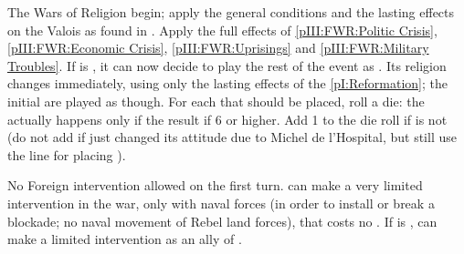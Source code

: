 

\phevnt
\aparag The Wars of Religion begin; apply the general conditions and the
lasting effects on the Valois as found in .
\aparag Apply the full effects of \ref{pIII:FWR:Politic Crisis},
\ref{pIII:FWR:Economic Crisis}, \ref{pIII:FWR:Uprisings} and
\ref{pIII:FWR:Military Troubles}.
\label{pIII:FWR:Hospital} If \FRA is \CATHCR, it
can now decide to play the rest of the event as \CATHCO.  Its religion changes
immediately, using only the lasting effects of the \ref{pI:Reformation}; the
initial \REVOLT are played as \CATHCR though.
\aparag For each \REVOLT that should be placed, roll a die: the \REVOLT
actually happens only if the result if 6 or higher. Add 1 to the die roll if
\FRA is not \CATHCO (do not add if \FRA just changed its attitude due to
Michel de l'Hospital, but still use the \CATHCR line for placing \REVOLT ).

\phdipl
\aparag No Foreign intervention allowed on the first turn.
\aparag \REB can make a very limited intervention in the war, only with naval
forces (in order to install or break a blockade; no naval movement of Rebel
land forces), that costs no \STAB.
\aparag If \FRA is \CATHCR, \LIG can make a limited intervention as an ally of
\FRA.

